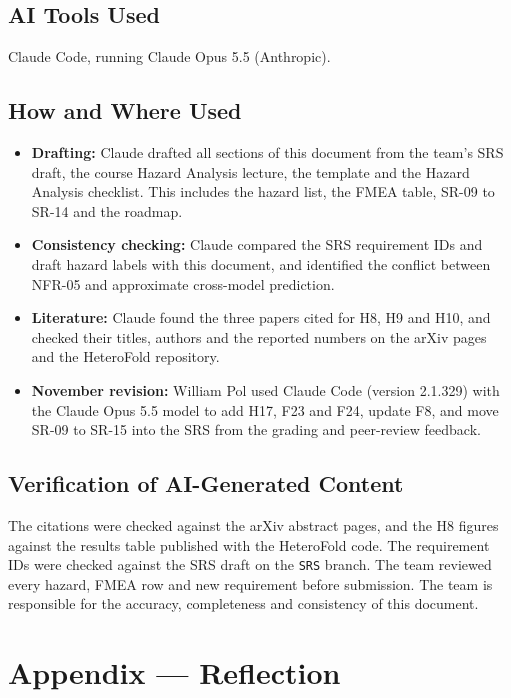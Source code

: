 \documentclass{article}
\begin{document}
\subsection{AI Tools Used}

Claude Code, running Claude Opus 5.5 (Anthropic).

\subsection{How and Where Used}

\begin{itemize}
  \item \textbf{Drafting:} Claude drafted all sections of this document from
  the team's SRS draft, the course Hazard Analysis lecture, the template and
  the Hazard Analysis checklist. This includes the hazard list, the FMEA
  table, SR-09 to SR-14 and the roadmap.
  \item \textbf{Consistency checking:} Claude compared the SRS requirement
  IDs and draft hazard labels with this document, and identified the
  conflict between NFR-05 and approximate cross-model prediction.
  \item \textbf{Literature:} Claude found the three papers cited for H8,
  H9 and H10, and checked their titles, authors and the reported numbers on
  the arXiv pages and the HeteroFold repository.
  \item \textbf{November revision:} William Pol used Claude Code (version
  2.1.329) with the Claude Opus 5.5 model to add H17, F23 and F24, update F8,
  and move SR-09 to SR-15 into the SRS from the grading and peer-review
  feedback.
\end{itemize}

\subsection{Verification of AI-Generated Content}

The citations were checked against the arXiv abstract pages, and the
H8 figures against the results table published with the HeteroFold code.
The requirement IDs were checked against the SRS draft on the \texttt{SRS}
branch. The team reviewed every hazard, FMEA row and new requirement
before submission. The team is
responsible for the accuracy, completeness and consistency of this
document.

\newpage{}

\section{Appendix --- Reflection}
\end{document}
